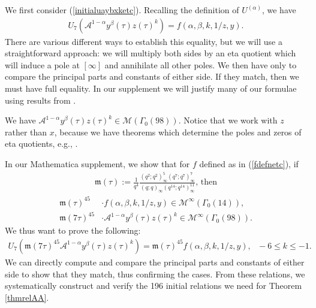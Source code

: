 \documentclass[reqno]{amsart}
\theoremstyle{definition}
\theoremstyle{remark}
\numberwithin{equation}{section}
\begin{document}
We first consider (\ref{initialuaybxketc}).  Recalling the definition of $U^{(\alpha)}$, we have
\begin{align*}
U_7\left(\mathcal{A}^{1-\alpha} y^{\beta}(\tau)z(\tau)^k \right)=f(\alpha,\beta,k,1/z,y).
\end{align*}  There are various different ways to establish this equality, but we will use a straightforward approach: we will multiply both sides by an eta quotient which will induce a pole at $[\infty]$ and annihilate all other poles.  We then have only to compare the principal parts and constants of either side.  If they match, then we must have full equality.  In our supplement we will justify many of our formulae using results from \cite{Radu}.

We have $\mathcal{A}^{1-\alpha} y^{\beta}(\tau)z(\tau)^k\in\mathcal{M}\left(  \Gamma_0(98)\right)$.  Notice that we work with $z$ rather than $x$, because we have theorems which determine the poles and zeros of eta quotients, e.g., \cite[Theorem 23]{Radu}.

In our Mathematica supplement, we show that for $f$ defined as in (\ref{fdefnetc}), if
\begin{align*}
\mathfrak{m}(\tau) := \frac{1}{q^{4}}\frac{(q^2;q^2)_{\infty}^{5}(q^7;q^7)_{\infty}^{7}}{(q;q)_{\infty}(q^{14};q^{14})_{\infty}^{11}}\text{, then}
\end{align*}
\begin{align*}
\mathfrak{m}(\tau)^{45}&\cdot f(\alpha,\beta,k,1/z,y)\in\mathcal{M}^{\infty}\left( \Gamma_0(14) \right),\\
\mathfrak{m}(7\tau)^{45}&\cdot \mathcal{A}^{1-\alpha} y^{\beta}(\tau)z(\tau)^k\in\mathcal{M}^{\infty}\left( \Gamma_0(98) \right).
\end{align*}  We thus want to prove the following:
\begin{align}
U_7\left(\mathfrak{m}(7\tau)^{45}\mathcal{A}^{1-\alpha} y^{\beta}(\tau)z(\tau)^k\right)=\mathfrak{m}(\tau)^{45}f(\alpha,\beta,k,1/z,y),\text{ }-6\le k\le -1.\label{fundrelmodproveA}
\end{align}  We can directly compute and compare the principal parts and constants of either side to show that they match, thus confirming the cases.  From these relations, we systematically construct and verify the 196 initial relations we need for Theorem \ref{thmrelAA}.
\end{document}
